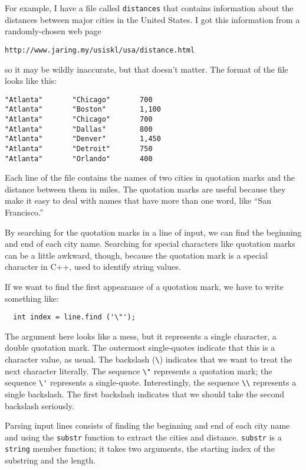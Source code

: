 For example, I have a file called {\tt distances} that contains
information about the distances between major cities in the
United States.  I got this information from a randomly-chosen
web page

\begin{lstlisting}
http://www.jaring.my/usiskl/usa/distance.html
\end{lstlisting}
%
so it may be wildly inaccurate, but that doesn't matter.  The
format of the file looks like this:

\begin{verbatim}
"Atlanta"       "Chicago"       700
"Atlanta"       "Boston"        1,100
"Atlanta"       "Chicago"       700
"Atlanta"       "Dallas"        800
"Atlanta"       "Denver"        1,450
"Atlanta"       "Detroit"       750
"Atlanta"       "Orlando"       400
\end{verbatim}
%
Each line of the file contains the names of two cities in quotation
marks and the distance between them in miles.  The quotation marks
are useful because they make it easy to deal with names that have
more than one word, like ``San Francisco.''

By searching for the quotation marks in a line of input, we
can find the beginning and end of each city name.
Searching for special characters like quotation marks can be a little
awkward, though, because the quotation mark is a special character
in C++, used to identify string values.

If we want to find the
first appearance of a quotation mark, we have to write something
like:

\begin{lstlisting}
  int index = line.find ('\"');
\end{lstlisting}
%
The argument here looks like a mess, but it represents a single
character, a double quotation mark.  The outermost single-quotes
indicate that this is a character value, as usual.  The backslash
(\verb+\+) indicates that we want to treat the next character
literally.  The sequence \verb+\"+ represents a quotation mark; the
sequence \verb+\'+ represents a single-quote.  Interestingly, the
sequence \verb+\\+ represents a single backslash.  The first backslash
indicates that we should take the second backslash seriously.


Parsing input lines consists of finding the beginning and
end of each city name and using
the {\tt substr} function to extract the cities and distance.
{\tt substr} is a {\tt string} member function;
it takes two arguments, the starting index of the substring
and the length.

